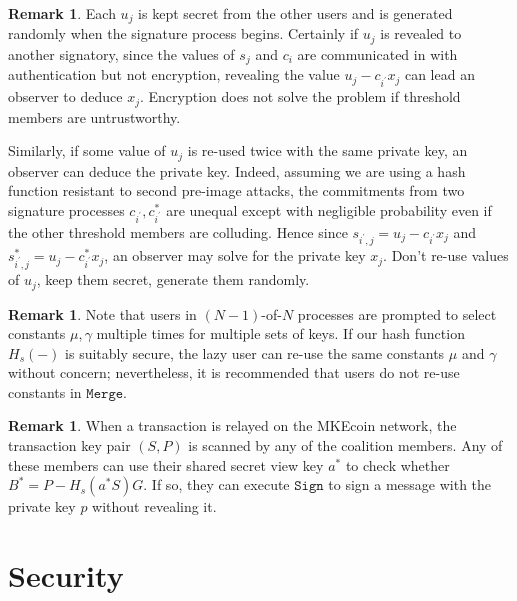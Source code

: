 \documentclass{mrl}
\theoremstyle{definition}
\newtheorem{disc}[theorem]{Remark}
\begin{document}
 
 \begin{disc}
 Each $u_j$ is kept secret from the other users and is generated randomly when the signature process begins. Certainly if $u_j$ is revealed to another signatory, since the values of $s_j$ and $c_i$ are communicated in with authentication but not encryption, revealing the value $u_j - c_{i^{\prime}} x_j$ can lead an observer to deduce $x_j$. Encryption does not solve the problem if threshold members are untrustworthy.
 
 
 Similarly, if some value of $u_j$ is re-used twice with the same private key, an observer can deduce the private key. Indeed, assuming we are using a hash function resistant to second pre-image attacks, the commitments from two signature processes $c_{i^{\prime}}, c_{i^{\prime}}^*$ are unequal except with negligible probability even if the other threshold members are colluding. Hence since $s_{i^{\prime},j} = u_j - c_{i^{\prime}} x_{j}$ and $s_{i^{\prime},j}^* = u_j - c_{i^{\prime}}^* x_{j}$, an observer may solve for the private key $x_j$. Don't re-use values of $u_j$, keep them secret, generate them randomly.
 
 \end{disc}
 
 \begin{disc}  Note that users in $(N-1)$-of-$N$ processes are prompted to select constants $\mu, \gamma$ multiple times for multiple sets of keys. If our hash function $H_s(-)$ is suitably secure, the lazy user can re-use the same constants $\mu$ and $\gamma$ without concern; nevertheless, it is recommended that users do not re-use constants in $\texttt{Merge}$. 
 \end{disc}
 
 \begin{disc}
 When a transaction is relayed on the MKEcoin network, the transaction key pair $(S,P)$ is scanned by any of the coalition members. Any of these members can use their shared secret view key $a^*$ to check whether $B^* = P - H_s(a^* S)G$. If so, they can execute $\texttt{Sign}$ to sign a message with the private key $p$ without revealing it.
 \end{disc}
 
 
 \section{Security}
 
 
\end{document}
